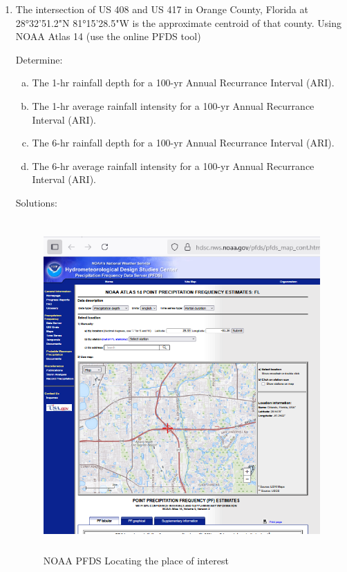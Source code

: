 \documentclass[12pt]{article}
\begin{document}
\begin{enumerate}
\clearpage
\item The intersection of US 408 and US 417 in Orange County, Florida at 28°32'51.2"N 81°15'28.5"W is the approximate centroid of that county. Using NOAA Atlas 14 (use the online PFDS tool)

Determine:
    \begin{enumerate}[a)]
        \item The 1-hr rainfall depth for a 100-yr Annual Recurrance Interval (ARI). 
        \item The 1-hr average rainfall intensity for a 100-yr Annual Recurrance Interval (ARI). 
        \item The 6-hr rainfall depth for a 100-yr Annual Recurrance Interval (ARI). 
        \item The 6-hr average rainfall intensity for a 100-yr Annual Recurrance Interval (ARI). 
    \end{enumerate}

Solutions:

\begin{figure}[h!] %
   \centering
   \includegraphics[height=5in]{pfds-1.png} 
   \caption{NOAA PFDS Locating the place of interest}
   \label{fig:pfds-1}
\end{figure}


\end{enumerate}
\end{document}
